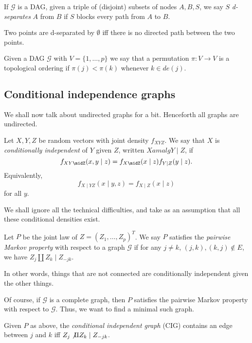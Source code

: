 \documentclass[a4paper]{article}
\begin{document}
\begin{defi}[d-separate]
  If $\mathcal{G}$ is a DAG, given a triple of (disjoint) subsets of nodes $A, B, S$, we say $S$ \emph{d-separates} $A$ from $B$ if $S$ blocks every path from $A$ to $B$.
\end{defi}

\begin{eg}
  Two points are d-separated by $\emptyset$ iff there is no directed path between the two points.
\end{eg}

\begin{defi}
  Given a DAG $\mathcal{G}$ with $V = \{1, \ldots, p\}$ we say that a permutation $\pi: V \to V$ is a topological ordering if $\pi(j) < \pi(k)$ whenever $k \in de(j)$.
\end{defi}

\subsection{Conditional independence graphs}
We shall now talk about undirected graphs for a bit. Henceforth all graphs are undirected.

\begin{defi}
  Let $X, Y, Z$ be random vectors with joint density $f_{XYZ}$. We say that $X$ is \emph{conditionally independent} of $Y$ given $Z$, written $X amalg Y \mid Z$, if
  \[
    f_{XY\midZ}(x, y \mid z) = f_{X\midZ}(x \mid z) f_{Y \mid Z} (y \mid z).
  \]
  Equivalently,
  \[
    f_{X\mid YZ} (x \mid y, z) = f_{X \mid Z}(x \mid z)
  \]
  for all $y$.
\end{defi}
We shall ignore all the technical difficulties, and take as an assumption that all these conditional densities exist.


\begin{defi}
  Let $P$ be the joint law of $Z = (Z_1, \ldots, Z_p)^T$. We say $P$ satisfies the \emph{pairwise Markov property} with respect to a graph $\mathcal{G}$ if for any $j \not= k$, $(j, k), (k, j) \not \in E$, we have $Z_j \amalg Z_k \mid Z_{-jk}$.
\end{defi}
In other words, things that are not connected are conditionally independent given the other things.

Of course, if $\mathcal{G}$ is a complete graph, then $P$ satisfies the pairwise Markov property with respect to $\mathcal{G}$. Thus, we want to find a minimal such graph.
\begin{defi}
  Given $P$ as above, the \emph{conditional independent graph} (CIG) contains an edge between $j$ and $k$ iff $Z_j \not \amalg Z_k \mid Z_{-jk}$.
\end{defi}
\end{document}
